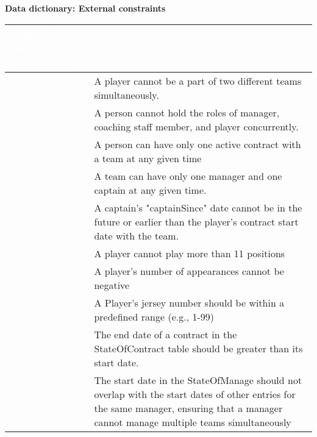 \documentclass{article}[h]
\begin{document}
    {\centering \textbf{Data dictionary: External constraints}\\}
    \begin{table}[H]
        \def\arraystretch{1.25}%
        \centering
        \begin{tabular}{|>{\columncolor{myColor}}  m{1.5cm} | m{13.5cm}| }
            \hline
            \rowcolor{myColor}
            \multicolumn{2}{| c |}  {\textcolor{white}{\large \textbf{External Integrity Constraints}}} \\
            \hline
            {\textcolor{white}{\textbf{1}}} & A player cannot be a part of two different teams simultaneously.  \\
            \hline
            {\textcolor{white}{\textbf{2}}} & A person cannot hold the roles of manager, coaching staff member, and player concurrently.  \\
            \hline
            {\textcolor{white}{\textbf{3}}} & A person can have only one active contract with a team at any given time  \\
            \hline
            {\textcolor{white}{\textbf{4}}} & A team can have only one manager and one captain at any given time.  \\
            \hline
            {\textcolor{white}{\textbf{5}}} & A captain's "captainSince" date cannot be in the future or earlier than the player's contract start date with the team. \\
            \hline
            {\textcolor{white}{\textbf{6}}} & A player cannot play more than 11 positions  \\
            \hline
            {\textcolor{white}{\textbf{7}}} & A player's number of appearances cannot be negative  \\
            \hline
            {\textcolor{white}{\textbf{8}}} & A Player's jersey number should be within a predefined range (e.g., 1-99) \\
            \hline
            {\textcolor{white}{\textbf{9}}} & The end date of a contract in the StateOfContract table should be greater than its start date. \\
            \hline
            {\textcolor{white}{\textbf{10}}} & The start date in the StateOfManage should not overlap with the start dates of other entries for the same manager, ensuring that a manager cannot manage multiple teams simultaneously \\
            \hline
        \end{tabular}\label{tab:table5}
    \end{table}
\end{document}
